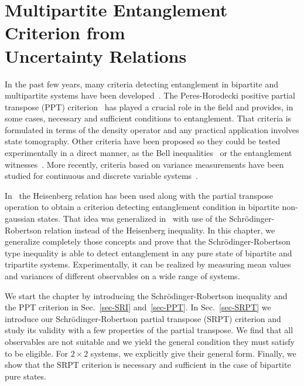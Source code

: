 
\chapter[Multipartite Entanglement Criterion from Uncertainty Relations]{Multipartite Entanglement Criterion from \\ Uncertainty Relations} \label{ch-1}

In the past few years, many criteria detecting entanglement in bipartite and multipartite systems have been developed~\cite{Min05,Bra05,Pat00}. The Peres-Horodecki positive partial transpose (PPT) criterion~\cite{Per96} has played a crucial role in the field and provides, in some cases, necessary and sufficient conditions to entanglement. That criteria is formulated in terms of the density operator and any practical application involves state tomography. Other criteria have been proposed so they could be tested experimentally in a direct manner, as the Bell inequalities~\cite{Bel64, Dur01} or the entanglement witnesses~\cite{Guh02}. More recently, criteria based on variance measurements have been studied for continuous and discrete variable systems~\cite{Sim00,Dua00,Hof03,Hil06,Kly07,Dur05,Gio03,Shc05,Guh04, Aga05, Nha06, Nha07,Son08}.

In~\cite{Aga05} the Heisenberg relation has been used along with the partial transpose operation to obtain a criterion detecting entanglement condition in bipartite non-gaussian states. That idea was generalized in~\cite{Nha07,Son08} with use of the Schr\"odinger-Robertson relation instead of the Heisenberg inequality.  In this chapter, we generalize completely those concepts and prove that the Schr\"odinger-Robertson type inequality is able to detect entanglement in any pure state of bipartite and tripartite systems. Experimentally, it can be realized by measuring mean values and variances of different observables on a wide range of systems.

We start the chapter by introducing the Schr\"odinger-Robertson inequality and the PPT criterion in Sec.~\ref{sec-SRI} and~\ref{sec-PPT}. In Sec.~\ref{sec-SRPT} we introduce our Schr\"odinger-Robertson partial transpose (SRPT) criterion and study its validity with a few properties of the partial transpose. We find that  all observables are not suitable and we yield the general condition they must satisfy to be eligible. For $2\times 2$ systems, we explicitly give their general form. Finally, we show that the SRPT criterion is necessary and sufficient in the case of bipartite pure states.

